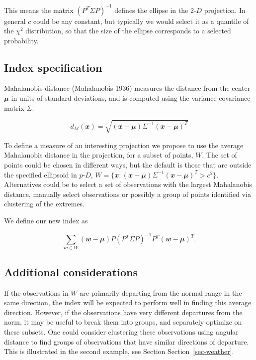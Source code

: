 \documentclass[
  12pt,
]{interact}
\newcommand\pD{$p\text{-}D$}
\newcommand\gD{$2\text{-}D$}
\begin{document}
This means the matrix \((P^T \Sigma P)^{-1}\) defines the ellipse in the
\gD{} projection. In general \(c\) could be any constant, but typically
we would select it as a quantile of the \(\chi^2\) distribution, so that
the size of the ellipse corresponds to a selected probability.

\subsection{Index specification}\label{index-specification}

Mahalanobis distance (Mahalanobis 1936) measures the distance from the
center \(\mathbfit{\mu}\) in units of standard deviations, and is
computed using the variance-covariance matrix \(\Sigma\).

\begin{equation}
d_M (\mathbfit{x}) = \sqrt{(\mathbfit{x}-\mathbfit{\mu}) \Sigma^{-1}(\mathbfit{x}-\mathbfit{\mu})^T}
\end{equation}

To define a measure of an interesting projection we propose to use the
average Mahalanobis distance in the projection, for a subset of points,
\(W\). The set of points could be chosen in different ways, but the
default is those that are outside the specified ellipsoid in \pD{},
\(W = \{\mathbfit{x}: (\mathbfit{x}-\mathbfit{\mu}) \Sigma^{-1}(\mathbfit{x}-\mathbfit{\mu})^T > c^2\}\).
Alternatives could be to select a set of observations with the largest
Mahalanobis distance, manually select observations or possibly a group
of points identified via clustering of the extremes.

We define our new index as

\begin{equation}
\sum_{\mathbfit{w} \in W} (\mathbfit{w} - \mathbfit{\mu}) P (P^T\Sigma P)^{-1}P^T(\mathbfit{w} - \mathbfit{\mu})^T.
\end{equation}

\subsection{Additional considerations}\label{additional-considerations}

If the observations in \(W\) are primarily departing from the normal
range in the same direction, the index will be expected to perform well
in finding this average direction. However, if the observations have
very different departures from the norm, it may be useful to break them
into groups, and separately optimize on these subsets. One could
consider clustering these observations using angular distance to find
groups of observations that have similar directions of departure. This
is illustrated in the second example, see Section
Section~\ref{sec-weather}.
\end{document}
